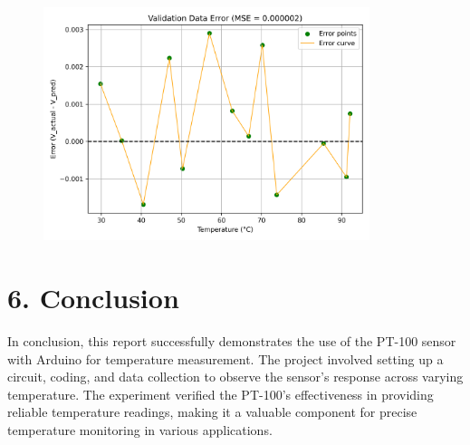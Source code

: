 \documentclass[12pt,a4paper]{article}
\begin{document}
\begin{figure}[h!]
    \centering
    \includegraphics[width=0.85\textwidth]{../figs/valid_error.png}
\end{figure}

\section*{6. Conclusion}

In conclusion, this report successfully demonstrates the use of the PT-100 sensor with Arduino for temperature measurement.  
The project involved setting up a circuit, coding, and data collection to observe the sensor's response across varying temperature.  
The experiment verified the PT-100's effectiveness in providing reliable temperature readings, making it a valuable component for precise temperature monitoring in various applications.
\end{document}
